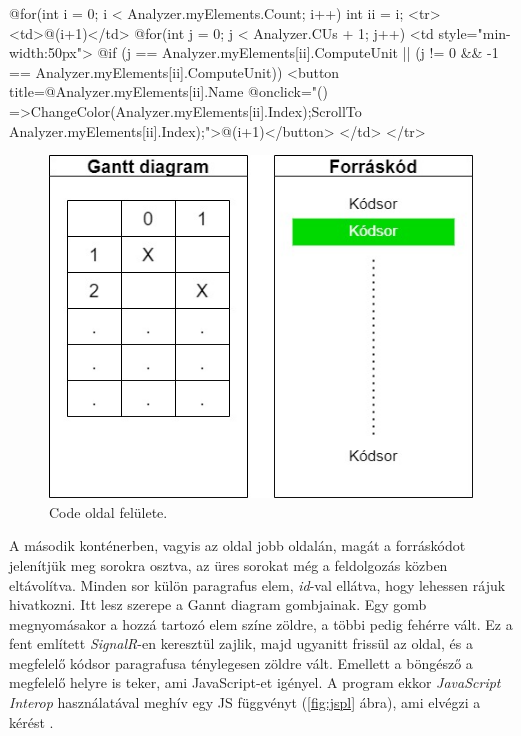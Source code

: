 \begin{cpp}
@for(int i = 0; i < Analyzer.myElements.Count; i++)
{
    int ii = i;
    <tr>
       <td>@(i+1)</td>
       @for(int j = 0; j < Analyzer.CUs + 1; j++)
       {
           <td style="min-width:50px">
           @if (j == Analyzer.myElements[ii].ComputeUnit || (j != 0 &&
              -1 == Analyzer.myElements[ii].ComputeUnit))
           {
              <button title=@Analyzer.myElements[ii].Name @onclick="()
              =>{ChangeColor(Analyzer.myElements[ii].Index);ScrollTo
              Analyzer.myElements[ii].Index);}">@(i+1)</button>
           }
           </td>
       }
    </tr>
}
\end{cpp}

\begin{figure}[h]
\centering
\includegraphics[scale=0.5]{images/Code_plan.jpg}
\caption{Code oldal felülete.}
\label{fig:code_plan}
\end{figure}

A második konténerben, vagyis az oldal jobb oldalán, magát a forráskódot jelenítjük meg sorokra osztva, az üres sorokat még a feldolgozás közben eltávolítva. Minden sor külön paragrafus elem, \textit{id}-val ellátva, hogy lehessen rájuk hivatkozni. Itt lesz szerepe a Gannt diagram gombjainak. Egy gomb megnyomásakor a hozzá tartozó elem színe zöldre, a többi pedig fehérre vált. Ez a fent említett \textit{SignalR}-en keresztül zajlik, majd ugyanitt frissül az oldal, és a megfelelő kódsor paragrafusa ténylegesen zöldre vált. Emellett a böngésző a megfelelő helyre is teker, ami JavaScript-et igényel. A program ekkor \textit{JavaScript Interop} használatával meghív egy JS függvényt (\ref{fig:jspl} ábra), ami elvégzi a kérést \cite{js_interop}.



